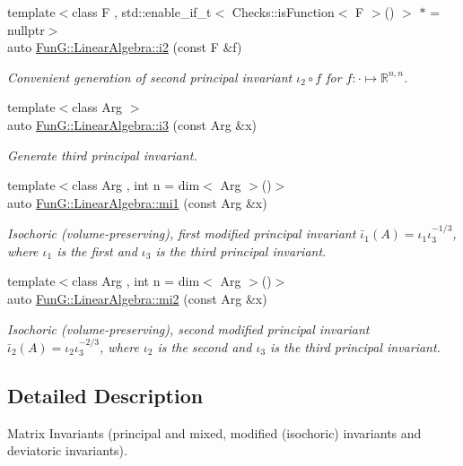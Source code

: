\begin{DoxyCompactItemize}
{\footnotesize template$<$class F , std\-::enable\-\_\-if\-\_\-t$<$ Checks\-::is\-Function$<$ F $>$() $>$ $\ast$  = nullptr$>$ }\\auto \hyperlink{group__InvariantGroup_gad3987f97353c8696e602ed1915b3cf47}{Fun\-G\-::\-Linear\-Algebra\-::i2} (const F \&f)
\begin{DoxyCompactList}\small\item\em Convenient generation of second principal invariant $ \iota_2\circ f $ for $f:\cdot\mapsto\mathbb{R}^{n,n}$. \end{DoxyCompactList}\item 
{\footnotesize template$<$class Arg $>$ }\\auto \hyperlink{group__InvariantGroup_gae1ad80b4b2f34a10564114fad28bc313}{Fun\-G\-::\-Linear\-Algebra\-::i3} (const Arg \&x)
\begin{DoxyCompactList}\small\item\em Generate third principal invariant. \end{DoxyCompactList}\item 
{\footnotesize template$<$class Arg , int n = dim$<$ Arg $>$()$>$ }\\auto \hyperlink{group__InvariantGroup_ga7eed5e2661171d81e192ac1db791244c}{Fun\-G\-::\-Linear\-Algebra\-::mi1} (const Arg \&x)
\begin{DoxyCompactList}\small\item\em Isochoric (volume-\/preserving), first modified principal invariant $ \bar\iota_1(A)=\iota_1\iota_3^{-1/3} $, where $\iota_1$ is the first and $\iota_3$ is the third principal invariant. \end{DoxyCompactList}\item 
{\footnotesize template$<$class Arg , int n = dim$<$ Arg $>$()$>$ }\\auto \hyperlink{group__InvariantGroup_ga9d219c5c48cce1d3af60345916963524}{Fun\-G\-::\-Linear\-Algebra\-::mi2} (const Arg \&x)
\begin{DoxyCompactList}\small\item\em Isochoric (volume-\/preserving), second modified principal invariant $ \bar\iota_2(A)=\iota_2\iota_3^{-2/3} $, where $\iota_2$ is the second and $\iota_3$ is the third principal invariant. \end{DoxyCompactList}\end{DoxyCompactItemize}


\subsection{Detailed Description}
Matrix Invariants (principal and mixed, modified (isochoric) invariants and deviatoric invariants). 

